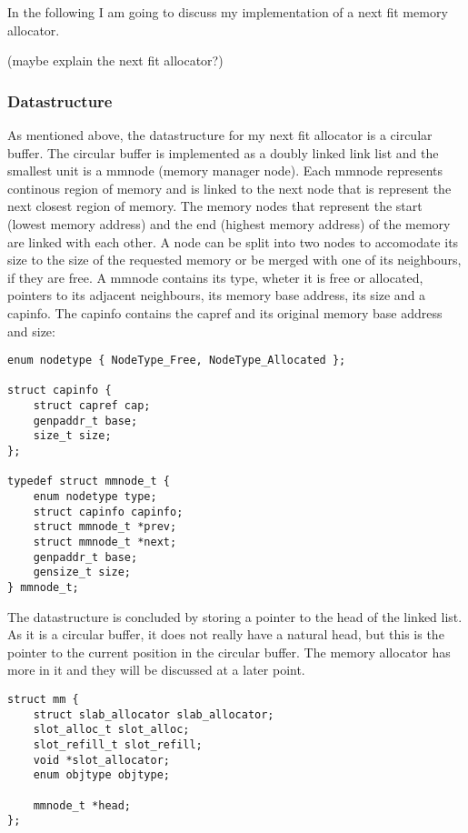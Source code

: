 In the following I am going to discuss my implementation of a next fit memory allocator.

(maybe explain the next fit allocator?)

\subsubsection{Datastructure}

As mentioned above, the datastructure for my next fit allocator is a circular buffer.
The circular buffer is implemented as a doubly linked link list and the smallest unit is a mmnode (memory manager node).
Each mmnode represents continous region of memory and is linked to the next node that is represent the next closest region of memory. The memory nodes that represent the start (lowest memory address) and the end (highest memory address) of the memory are linked with each other.
A node can be split into two nodes to accomodate its size to the size of the requested memory or be merged with one of its neighbours, if they are free.
A mmnode contains its type, wheter it is free or allocated, pointers to its adjacent neighbours, its memory base address, its size and a capinfo. The capinfo contains the capref and its original memory base address and size:

\begin{lstlisting}
enum nodetype { NodeType_Free, NodeType_Allocated };

struct capinfo {
    struct capref cap;
    genpaddr_t base;
    size_t size;
};

typedef struct mmnode_t {
    enum nodetype type;
    struct capinfo capinfo;
    struct mmnode_t *prev;
    struct mmnode_t *next;
    genpaddr_t base;
    gensize_t size;
} mmnode_t;
\end{lstlisting}

The datastructure is concluded by storing a pointer to the head of the linked list. As it is a circular buffer, it does not really have a natural head, but this is the pointer to the current position in the circular buffer. The memory allocator has more in it and they will be discussed at a later point.

\begin{lstlisting}
struct mm {
    struct slab_allocator slab_allocator;
    slot_alloc_t slot_alloc;
    slot_refill_t slot_refill;
    void *slot_allocator;
    enum objtype objtype;

    mmnode_t *head;
};
\end{lstlisting}

